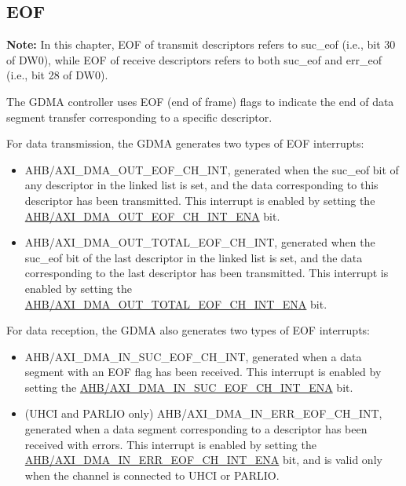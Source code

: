 \documentclass[main\_\_EN.tex]{subfiles}
\begin{document}
\subsection{EOF}

{\bfseries Note: }In this chapter, EOF of transmit descriptors refers to suc\_eof (i.e., bit 30 of DW0), while EOF of receive descriptors refers to both suc\_eof and err\_eof (i.e., bit 28 of DW0).

The GDMA controller uses EOF (end of frame) flags to indicate the end of data segment transfer corresponding to a specific descriptor.

For data transmission, the GDMA generates two types of EOF interrupts:
\begin{itemize}
    \item AHB/AXI\_DMA\_OUT\_EOF\_CH\_INT, generated when the suc\_eof bit of any descriptor in the linked list is set, and the data corresponding to this descriptor has been transmitted. This interrupt is enabled by setting the \hyperref[fielddesc:AHBDMAOUTEOFCHNINTENA]{AHB/AXI\_DMA\_OUT\_EOF\_CH\_INT\_ENA} bit.
    \item AHB/AXI\_DMA\_OUT\_TOTAL\_EOF\_CH\_INT, generated when the suc\_eof bit of the last descriptor in the linked list is set, and the data corresponding to the last descriptor has been transmitted. This interrupt is enabled by setting the \hyperref[fielddesc:AHBDMAOUTTOTALEOFCHNINTENA]{AHB/AXI\_DMA\_OUT\_TOTAL\_EOF\_CH\_INT\_ENA} bit.
\end{itemize}

For data reception, the GDMA also generates two types of EOF interrupts:
\begin{itemize}
    \item AHB/AXI\_DMA\_IN\_SUC\_EOF\_CH\_INT, generated when a data segment with an EOF flag has been received. This interrupt is enabled by setting the \hyperref[fielddesc:AHBDMAINSUCEOFCHNINTENA]{AHB/AXI\_DMA\_IN\_SUC\_EOF\_CH\_INT\_ENA} bit.
    \item (UHCI and PARLIO only) AHB/AXI\_DMA\_IN\_ERR\_EOF\_CH\_INT, generated when a data segment corresponding to a descriptor has been received with errors. This interrupt is enabled by setting the \hyperref[fielddesc:AHBDMAINERREOFCHNINTENA]{AHB/AXI\_DMA\_IN\_ERR\_EOF\_CH\_INT\_ENA} bit, and is valid only when the channel is connected to UHCI or PARLIO.
\end{itemize}
\end{document}
